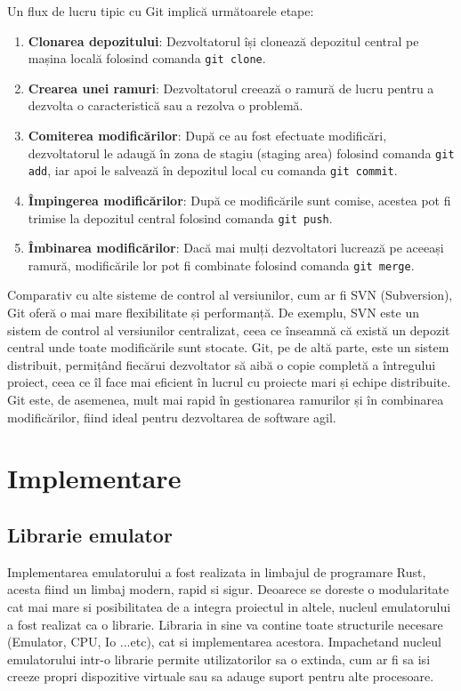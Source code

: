 \documentclass[titlepage,12pt]{article}
\begin{document}
Un flux de lucru tipic cu Git implică următoarele etape:
\begin{enumerate}
\item \textbf{Clonarea depozitului}: Dezvoltatorul își clonează depozitul central pe mașina locală folosind comanda \texttt{git clone}.
\item \textbf{Crearea unei ramuri}: Dezvoltatorul creează o ramură de lucru pentru a dezvolta o caracteristică sau a rezolva o problemă.
\item \textbf{Comiterea modificărilor}: După ce au fost efectuate modificări, dezvoltatorul le adaugă în zona de stagiu (staging area) folosind comanda \texttt{git add}, iar apoi le salvează în depozitul local cu comanda \texttt{git commit}.
\item \textbf{Împingerea modificărilor}: După ce modificările sunt comise, acestea pot fi trimise la depozitul central folosind comanda \texttt{git push}.
\item \textbf{Îmbinarea modificărilor}: Dacă mai mulți dezvoltatori lucrează pe aceeași ramură, modificările lor pot fi combinate folosind comanda \texttt{git merge}.
\end{enumerate}

Comparativ cu alte sisteme de control al versiunilor, cum ar fi SVN (Subversion), Git oferă o mai mare flexibilitate și performanță. De exemplu, SVN este un sistem de control al versiunilor centralizat, ceea ce înseamnă că există un depozit central unde toate modificările sunt stocate. Git, pe de altă parte, este un sistem distribuit, permițând fiecărui dezvoltator să aibă o copie completă a întregului proiect, ceea ce îl face mai eficient în lucrul cu proiecte mari și echipe distribuite. Git este, de asemenea, mult mai rapid în gestionarea ramurilor și în combinarea modificărilor, fiind ideal pentru dezvoltarea de software agil.

\section{Implementare}
\subsection{Librarie emulator}
Implementarea emulatorului a fost realizata in limbajul de programare Rust, acesta fiind un limbaj modern, rapid si sigur. Deoarece se doreste o modularitate cat mai mare si posibilitatea de a integra proiectul in altele, nucleul emulatorului a fost realizat ca o librarie.
Libraria in sine va contine toate structurile necesare (Emulator, CPU, Io ...etc), cat si implementarea acestora. Impachetand nucleul emulatorului intr-o librarie permite utilizatorilor sa o extinda, cum ar fi sa isi creeze propri dispozitive virtuale sau sa adauge suport pentru alte procesoare.
\end{document}
